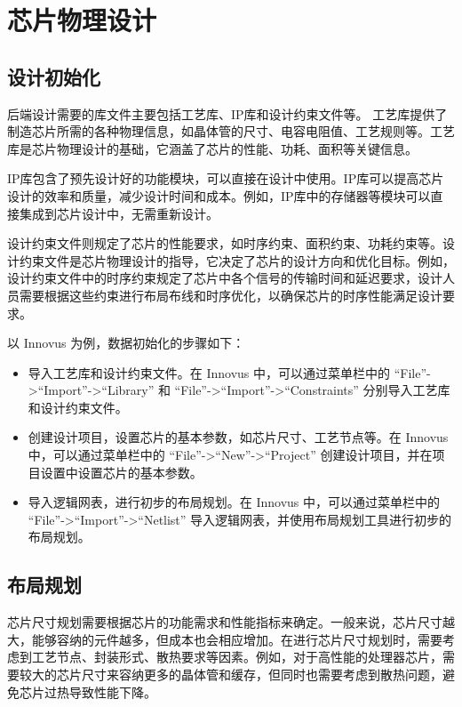 \section{芯片物理设计}\label{sec:17-chip-backend-002}

\subsection{设计初始化}\label{sec:17-chip-backend-003}

后端设计需要的库文件主要包括工艺库、IP库和设计约束文件等。 工艺库提供了制造芯片所需的各种物理信息，如晶体管的尺寸、电容电阻值、工艺规则等。工艺库是芯片物理设计的基础，它涵盖了芯片的性能、功耗、面积等关键信息。

IP库包含了预先设计好的功能模块，可以直接在设计中使用。IP库可以提高芯片设计的效率和质量，减少设计时间和成本。例如，IP库中的存储器等模块可以直接集成到芯片设计中，无需重新设计。

设计约束文件则规定了芯片的性能要求，如时序约束、面积约束、功耗约束等。设计约束文件是芯片物理设计的指导，它决定了芯片的设计方向和优化目标。例如，设计约束文件中的时序约束规定了芯片中各个信号的传输时间和延迟要求，设计人员需要根据这些约束进行布局布线和时序优化，以确保芯片的时序性能满足设计要求。

以 Innovus 为例，数据初始化的步骤如下：

\begin{itemize}
\item
  导入工艺库和设计约束文件。在 Innovus 中，可以通过菜单栏中的 ``File''-\textgreater{}``Import''-\textgreater{}``Library'' 和 ``File''-\textgreater{}``Import''-\textgreater{}``Constraints'' 分别导入工艺库和设计约束文件。
\item
  创建设计项目，设置芯片的基本参数，如芯片尺寸、工艺节点等。在 Innovus 中，可以通过菜单栏中的 ``File''-\textgreater{}``New''-\textgreater{}``Project'' 创建设计项目，并在项目设置中设置芯片的基本参数。
\item
  导入逻辑网表，进行初步的布局规划。在 Innovus 中，可以通过菜单栏中的 ``File''-\textgreater{}``Import''-\textgreater{}``Netlist'' 导入逻辑网表，并使用布局规划工具进行初步的布局规划。
\end{itemize}

\subsection{布局规划}\label{sec:17-chip-backend-004}

芯片尺寸规划需要根据芯片的功能需求和性能指标来确定。一般来说，芯片尺寸越大，能够容纳的元件越多，但成本也会相应增加。在进行芯片尺寸规划时，需要考虑到工艺节点、封装形式、散热要求等因素。例如，对于高性能的处理器芯片，需要较大的芯片尺寸来容纳更多的晶体管和缓存，但同时也需要考虑到散热问题，避免芯片过热导致性能下降。

